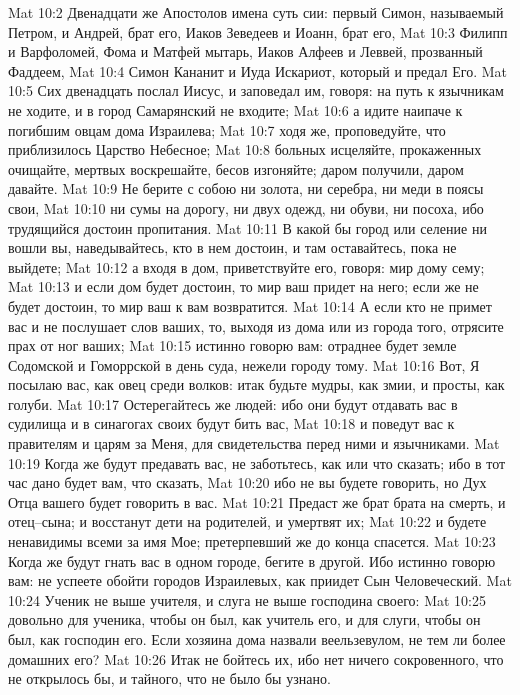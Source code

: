Mat 10:2  Двенадцати же Апостолов имена суть сии: первый Симон, называемый Петром, и Андрей, брат его, Иаков Зеведеев и Иоанн, брат его,
Mat 10:3  Филипп и Варфоломей, Фома и Матфей мытарь, Иаков Алфеев и Леввей, прозванный Фаддеем,
Mat 10:4  Симон Кананит и Иуда Искариот, который и предал Его.
Mat 10:5  Сих двенадцать послал Иисус, и заповедал им, говоря: на путь к язычникам не ходите, и в город Самарянский не входите;
Mat 10:6  а идите наипаче к погибшим овцам дома Израилева;
Mat 10:7  ходя же, проповедуйте, что приблизилось Царство Небесное;
Mat 10:8  больных исцеляйте, прокаженных очищайте, мертвых воскрешайте, бесов изгоняйте; даром получили, даром давайте.
Mat 10:9  Не берите с собою ни золота, ни серебра, ни меди в поясы свои,
Mat 10:10  ни сумы на дорогу, ни двух одежд, ни обуви, ни посоха, ибо трудящийся достоин пропитания.
Mat 10:11  В какой бы город или селение ни вошли вы, наведывайтесь, кто в нем достоин, и там оставайтесь, пока не выйдете;
Mat 10:12  а входя в дом, приветствуйте его, говоря: мир дому сему;
Mat 10:13  и если дом будет достоин, то мир ваш придет на него; если же не будет достоин, то мир ваш к вам возвратится.
Mat 10:14  А если кто не примет вас и не послушает слов ваших, то, выходя из дома или из города того, отрясите прах от ног ваших;
Mat 10:15  истинно говорю вам: отраднее будет земле Содомской и Гоморрской в день суда, нежели городу тому.
Mat 10:16  Вот, Я посылаю вас, как овец среди волков: итак будьте мудры, как змии, и просты, как голуби.
Mat 10:17  Остерегайтесь же людей: ибо они будут отдавать вас в судилища и в синагогах своих будут бить вас,
Mat 10:18  и поведут вас к правителям и царям за Меня, для свидетельства перед ними и язычниками.
Mat 10:19  Когда же будут предавать вас, не заботьтесь, как или что сказать; ибо в тот час дано будет вам, что сказать,
Mat 10:20  ибо не вы будете говорить, но Дух Отца вашего будет говорить в вас.
Mat 10:21  Предаст же брат брата на смерть, и отец--сына; и восстанут дети на родителей, и умертвят их;
Mat 10:22  и будете ненавидимы всеми за имя Мое; претерпевший же до конца спасется.
Mat 10:23  Когда же будут гнать вас в одном городе, бегите в другой. Ибо истинно говорю вам: не успеете обойти городов Израилевых, как приидет Сын Человеческий.
Mat 10:24  Ученик не выше учителя, и слуга не выше господина своего:
Mat 10:25  довольно для ученика, чтобы он был, как учитель его, и для слуги, чтобы он был, как господин его. Если хозяина дома назвали веельзевулом, не тем ли более домашних его?
Mat 10:26  Итак не бойтесь их, ибо нет ничего сокровенного, что не открылось бы, и тайного, что не было бы узнано.

